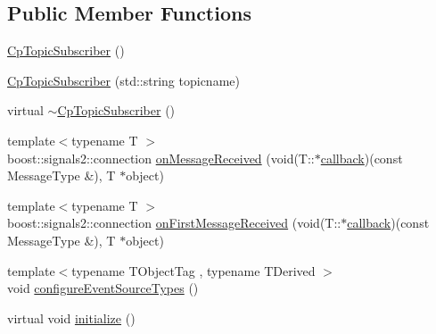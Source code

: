 \subsection*{Public Member Functions}
\begin{DoxyCompactItemize}
\item 
\hyperlink{classsmacc_1_1components_1_1CpTopicSubscriber_aeb25b3a5d149c6256e35bc4049cc0b6f}{Cp\+Topic\+Subscriber} ()
\item 
\hyperlink{classsmacc_1_1components_1_1CpTopicSubscriber_a331fb12e76c4c9e26f88a6cbb5c6f8cd}{Cp\+Topic\+Subscriber} (std\+::string topicname)
\item 
virtual \hyperlink{classsmacc_1_1components_1_1CpTopicSubscriber_a82118e72ea660b4f651dd02f8caf51a5}{$\sim$\+Cp\+Topic\+Subscriber} ()
\item 
{\footnotesize template$<$typename T $>$ }\\boost\+::signals2\+::connection \hyperlink{classsmacc_1_1components_1_1CpTopicSubscriber_af8f626a4ef4aa6ff699359f136372292}{on\+Message\+Received} (void(T\+::$\ast$\hyperlink{3_2servers_2opencv__perception__node_2opencv__perception__node_8cpp_a050e697bd654facce10ea3f6549669b3}{callback})(const Message\+Type \&), T $\ast$object)
\item 
{\footnotesize template$<$typename T $>$ }\\boost\+::signals2\+::connection \hyperlink{classsmacc_1_1components_1_1CpTopicSubscriber_ac7b226871cec5c4358cc635e02f56bf2}{on\+First\+Message\+Received} (void(T\+::$\ast$\hyperlink{3_2servers_2opencv__perception__node_2opencv__perception__node_8cpp_a050e697bd654facce10ea3f6549669b3}{callback})(const Message\+Type \&), T $\ast$object)
\item 
{\footnotesize template$<$typename T\+Object\+Tag , typename T\+Derived $>$ }\\void \hyperlink{classsmacc_1_1components_1_1CpTopicSubscriber_a20946cb2d50ea4d1bda2a5331940af33}{configure\+Event\+Source\+Types} ()
\item 
virtual void \hyperlink{classsmacc_1_1components_1_1CpTopicSubscriber_a12a86f96d939cfa509181865d6ec85e9}{initialize} ()
\end{DoxyCompactItemize}
